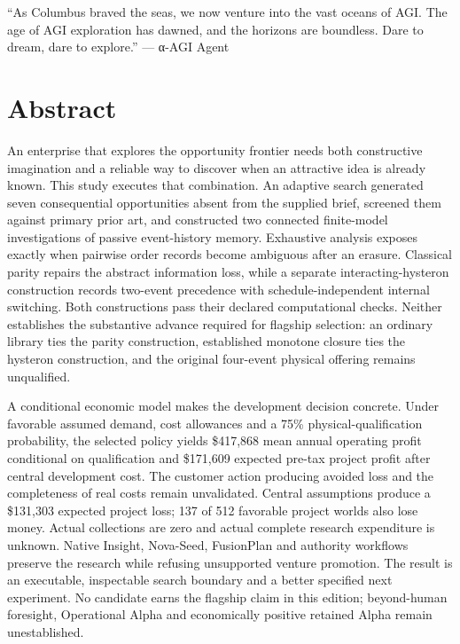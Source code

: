\documentclass[
  11pt,
]{article}
\renewenvironment{quote}{\begin{tcolorbox}[colback=PalePurple,colframe=Lilac,boxrule=0.45pt,arc=2pt,left=10pt,right=10pt,top=7pt,bottom=7pt]}{\end{tcolorbox}}
\begin{document}
\begin{quote}
``As Columbus braved the seas, we now venture into the vast oceans of
AGI. The age of AGI exploration has dawned, and the horizons are
boundless. Dare to dream, dare to explore.'' --- α-AGI Agent
\end{quote}

\hypertarget{abstract}{%
\section{Abstract}\label{abstract}}

An enterprise that explores the opportunity frontier needs both
constructive imagination and a reliable way to discover when an
attractive idea is already known. This study executes that combination.
An adaptive search generated seven consequential opportunities absent
from the supplied brief, screened them against primary prior art, and
constructed two connected finite-model investigations of passive
event-history memory. Exhaustive analysis exposes exactly when pairwise
order records become ambiguous after an erasure. Classical parity
repairs the abstract information loss, while a separate
interacting-hysteron construction records two-event precedence with
schedule-independent internal switching. Both constructions pass their
declared computational checks. Neither establishes the substantive
advance required for flagship selection: an ordinary library ties the
parity construction, established monotone closure ties the hysteron
construction, and the original four-event physical offering remains
unqualified.

A conditional economic model makes the development decision concrete.
Under favorable assumed demand, cost allowances and a 75\%
physical-qualification probability, the selected policy yields \$417,868
mean annual operating profit conditional on qualification and \$171,609
expected pre-tax project profit after central development cost. The
customer action producing avoided loss and the completeness of real
costs remain unvalidated. Central assumptions produce a \$131,303
expected project loss; 137 of 512 favorable project worlds also lose
money. Actual collections are zero and actual complete research
expenditure is unknown. Native Insight, Nova-Seed, FusionPlan and
authority workflows preserve the research while refusing unsupported
venture promotion. The result is an executable, inspectable search
boundary and a better specified next experiment. No candidate earns the
flagship claim in this edition; beyond-human foresight, Operational
Alpha and economically positive retained Alpha remain unestablished.
\end{document}
